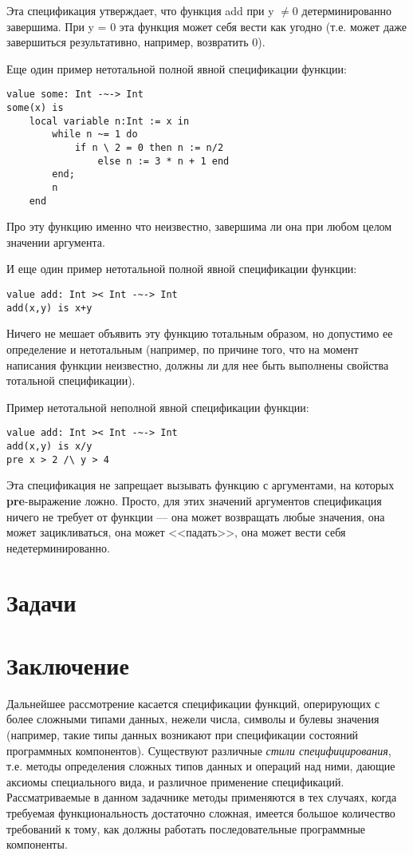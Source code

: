 \documentclass[14pt, twoside]{extreport}
\begin{document}
Эта спецификация утверждает, что функция add при y $\neq 0$ детерминированно завершима. При y = 0 эта функция может себя вести как угодно (т.е. может даже завершиться результативно, например, возвратить 0).

Еще один пример нетотальной полной явной спецификации функции:
\begin{lstlisting}
value some: Int -~-> Int
some(x) is
    local variable n:Int := x in
        while n ~= 1 do
            if n \ 2 = 0 then n := n/2
                else n := 3 * n + 1 end
        end;
        n
    end
\end{lstlisting}
Про эту функцию именно что неизвестно, завершима ли она при любом целом значении аргумента.

И еще один пример нетотальной полной явной спецификации функции:
\begin{lstlisting}
value add: Int >< Int -~-> Int
add(x,y) is x+y
\end{lstlisting}
Ничего не мешает объявить эту функцию тотальным образом, но допустимо ее определение и нетотальным (например, по причине того, что на момент написания функции неизвестно, должны ли для нее быть выполнены свойства тотальной спецификации).

Пример нетотальной неполной явной спецификации функции:
\begin{lstlisting}
value add: Int >< Int -~-> Int
add(x,y) is x/y
pre x > 2 /\ y > 4
\end{lstlisting}

Эта спецификация не запрещает вызывать функцию с аргументами, на которых \textbf{pre}-выражение ложно. Просто, для этих значений аргументов спецификация ничего не требует от функции --- она может возвращать любые значения, она может зацикливаться, она может <<падать>>, она может вести себя недетерминированно.


\section*{Задачи}





\section*{Заключение}
Дальнейшее рассмотрение касается спецификации функций, оперирующих с более сложными типами данных, нежели числа, символы и булевы значения (например, такие типы данных возникают при спецификации состояний программных компонентов). Существуют различные \emph{стили специфицирования}, т.е. методы определения сложных типов данных и операций над ними, дающие аксиомы специального вида, и различное применение спецификаций. Рассматриваемые в данном задачнике методы применяются в тех случаях, когда требуемая функциональность достаточно сложная, имеется большое количество требований к тому, как должны работать последовательные программные компоненты.
\end{document}

